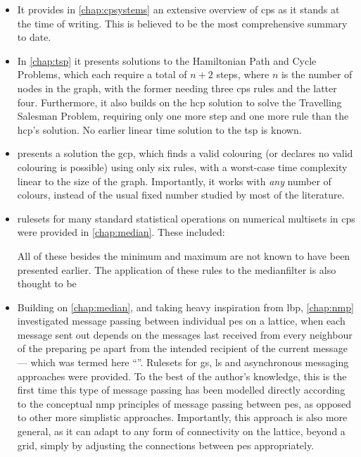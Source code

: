 \begin{itemize}
    \item It provides in \cref{chap:cpsystems} an extensive overview of \gls{cps} as it stands at the time of writing.  This is believed to be the most comprehensive summary to date.
    \item In \cref{chap:tsp} it presents solutions to the Hamiltonian Path and Cycle Problems, which each require a total of \(n + 2\) steps, where \(n\) is the number of nodes in the graph, with the former needing three \gls{cps} rules and the latter four.  Furthermore, it also builds on the \gls{hcp} solution to solve the Travelling Salesman Problem, requiring only one more step and one more rule than the \gls{hcp}'s solution.  No earlier linear time solution to the \gls{tsp} is known.
    \item {} presents a solution the \gls{gcp}, which finds a valid colouring (or declares no valid colouring is possible) using only six rules, with a worst-case time complexity linear to the size of the graph.  Importantly, it works with \emph{any} number of colours, instead of the usual fixed number studied by most of the literature.
    \item \Glspl{ruleset} for many standard statistical operations on numerical multisets in \gls{cps} were provided in \cref{chap:median}.  These included:
    All of these besides the minimum and maximum are not known to have been presented earlier.  The application of these rules to the \gls{medianfilter} is also thought to be 
    \item Building on \cref{chap:median}, and taking heavy inspiration from \gls{lbp}, \cref{chap:nmp} investigated message passing between individual \glspl{pe} on a lattice, when each message sent out depends on the messages last received from every neighbour of the preparing \gls{pe} apart from the intended recipient of the current message --- which was termed here ``''.  Rulesets for \gls{gs}, \gls{ls} and asynchronous messaging approaches were provided.  To the best of the author's knowledge, this is the first time this type of message passing has been modelled directly according to the conceptual \gls{nmp} principles of message passing between \glspl{pe}, as opposed to other more simplistic approaches.  Importantly, this approach is also more general, as it can adapt to any form of connectivity on the lattice, beyond a grid, simply by adjusting the connections between \glspl{pe} appropriately.

\end{itemize}
